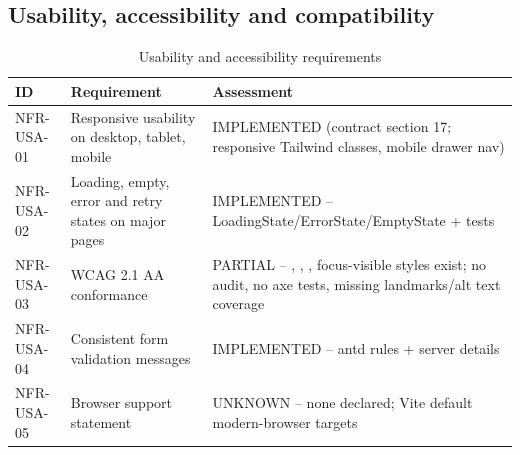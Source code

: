 \subsection{Usability, accessibility and compatibility}
\begin{table}[H]
\centering
\caption{Usability and accessibility requirements}
\label{tab:nfr-usability}
\begin{tabular}{@{}C{1.4cm}L{8.8cm}L{3.8cm}@{}}
\toprule
\textbf{ID} & \textbf{Requirement} & \textbf{Assessment} \\
\midrule
NFR-USA-01 & Responsive usability on desktop, tablet, mobile & IMPLEMENTED (contract section 17; responsive Tailwind classes, mobile drawer nav) \\
NFR-USA-02 & Loading, empty, error and retry states on major pages & IMPLEMENTED -- LoadingState/ErrorState/EmptyState + tests \\
NFR-USA-03 & WCAG 2.1 AA conformance & PARTIAL -- , , , focus-visible styles exist; no audit, no axe tests, missing landmarks/alt text coverage \\
NFR-USA-04 & Consistent form validation messages & IMPLEMENTED -- antd rules + server  details \\
NFR-USA-05 & Browser support statement & UNKNOWN -- none declared; Vite default modern-browser targets \\
\bottomrule
\end{tabular}
\end{table}

